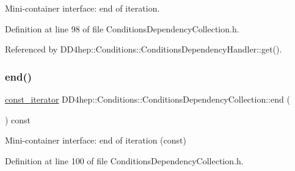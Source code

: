 Mini-\/container interface\+: end of iteration. 



Definition at line 98 of file Conditions\+Dependency\+Collection.\+h.



Referenced by D\+D4hep\+::\+Conditions\+::\+Conditions\+Dependency\+Handler\+::get().

\hypertarget{class_d_d4hep_1_1_conditions_1_1_conditions_dependency_collection_ade5b4e11a1192ba13058c01ef7347526}{}\label{class_d_d4hep_1_1_conditions_1_1_conditions_dependency_collection_ade5b4e11a1192ba13058c01ef7347526} 
\subsubsection{\texorpdfstring{end()}{end()}\hspace{0.1cm}{\footnotesize\ttfamily [2/2]}}
{\footnotesize\ttfamily \hyperlink{class_d_d4hep_1_1_conditions_1_1_conditions_dependency_collection_ab5e9bcdc3330c3b694303f627799dc84}{const\+\_\+iterator} D\+D4hep\+::\+Conditions\+::\+Conditions\+Dependency\+Collection\+::end (\begin{DoxyParamCaption}{ }\end{DoxyParamCaption}) const\hspace{0.3cm}{\ttfamily [inline]}}



Mini-\/container interface\+: end of iteration (const) 



Definition at line 100 of file Conditions\+Dependency\+Collection.\+h.

\hypertarget{class_d_d4hep_1_1_conditions_1_1_conditions_dependency_collection_aa1ab8e6418ce818e247ac52baf25bf5e}{}\label{class_d_d4hep_1_1_conditions_1_1_conditions_dependency_collection_aa1ab8e6418ce818e247ac52baf25bf5e} 
